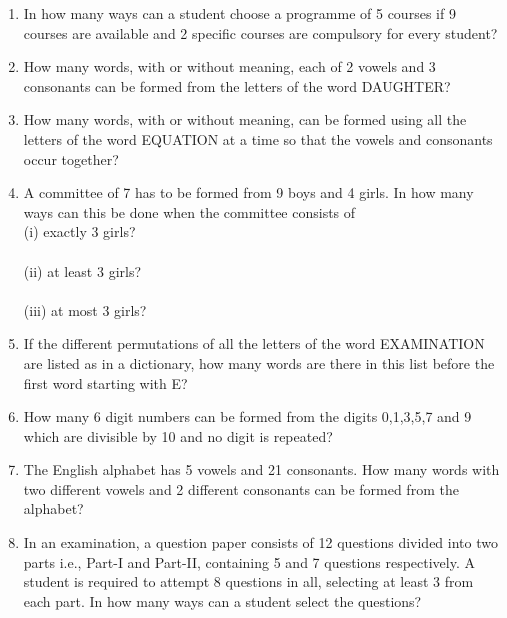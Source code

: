 \begin{enumerate}[label=\arabic*.,ref=\thesubsection.\theenumi]
\item In how many ways can a student choose a programme of 5 courses if 9 courses are available and 2 specific courses are compulsory for every student?\\

\item How many words, with or without meaning, each of 2 vowels and 3 consonants can be formed from the letters of the word DAUGHTER?\\

\item How many words, with or without meaning, can be formed using all the letters of the word EQUATION at a time so that the vowels and consonants occur together?\\

\item A committee of 7 has to be formed from 9 boys and 4 girls. In how many ways can this be done when the committee consists of\\
(i) exactly 3 girls?\\
\\(ii) at least 3 girls?\\
\\(iii) at most 3 girls?\\

\item If the different permutations of all the letters of the word EXAMINATION are listed as in a dictionary, how many words are there in this list before the first word starting with E?\\

\item How many 6 digit numbers can be formed from the digits 0,1,3,5,7 and 9 which are divisible by 10 and no digit is repeated?\\

\item The English alphabet has 5 vowels and 21 consonants. How many words with two different vowels and 2 different consonants can be formed from the alphabet?\\

\item In an examination, a question paper consists of 12 questions divided into two parts i.e., Part-I and Part-II, containing 5 and 7 questions respectively. A student is required to attempt 8 questions in all, selecting at least 3 from each part. In how many ways can a student select the questions?\\


\end{enumerate}
